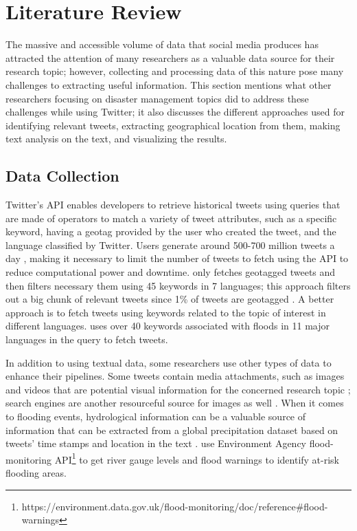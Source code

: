 \chapter{Literature Review}

The massive and accessible volume of data that social media produces has attracted the attention of
many researchers as a valuable data source for their research topic; however, collecting and
processing data of this nature pose many challenges to extracting useful information. This section
mentions what other researchers focusing on disaster management topics did to address these
challenges while using Twitter; it also discusses the different approaches used for identifying
relevant tweets, extracting geographical location from them, making text analysis on the text, and visualizing the results.

\section{Data Collection} 

Twitter's \ac{API} enables developers to retrieve historical tweets using
queries that are made of operators to match a variety of tweet attributes, such as a specific
keyword, having a geotag provided by the user who created the tweet, and the language classified by
Twitter. Users generate around 500-700 million tweets a day \cite{inproceedings}, making it
necessary to limit the number of tweets to fetch using the \ac{API} to reduce computational power and
downtime.  only fetches geotagged tweets and then filters
necessary
them using 45 keywords in 7 languages; this approach filters out a big chunk of relevant tweets
since 1\% of tweets are geotagged \cite{middletonRealTimeCrisisMapping2014}. A better approach is to
fetch tweets using keywords related to the topic of interest in different languages.
 uses over 40 keywords associated with floods in 11
major languages in the query to fetch tweets.

In addition to using textual data, some researchers use other types of data to enhance their
pipelines. Some tweets contain media attachments, such as images and videos that are potential
visual information for the concerned research topic
\cite{alamFloodDetectionTwitter2020}\cite{saidFloodsDetectionTwitter2020}\cite{ningPrototypingSocialMedia2020};
search engines are another resourceful source for images as well
\cite{fengExtractionPluvialFlood2018}. When it comes to flooding events, hydrological information
can be a valuable source of information that can be extracted from a global precipitation dataset
based on tweets' time stamps and location in the text
\cite{debruijnImprovingClassificationFlood2020}.
 use Environment Agency flood-monitoring
\ac{API}\footnote{https://environment.data.gov.uk/flood-monitoring/doc/reference\#flood-warnings} to
get river gauge levels and flood warnings to identify at-risk flooding areas.

